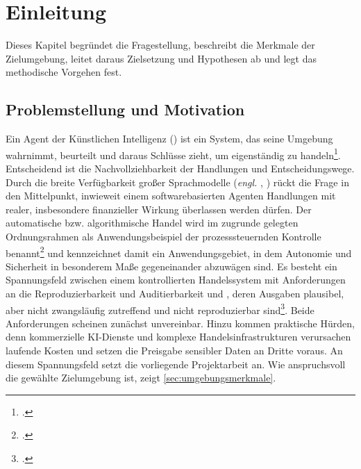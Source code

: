 
\chapter{Einleitung}
\label{cha:einleitung}

Dieses Kapitel begründet die Fragestellung, beschreibt die Merkmale der Zielumgebung, leitet daraus Zielsetzung und Hypothesen ab und legt das methodische Vorgehen fest.

\section{Problemstellung und Motivation}
\label{sec:problemstellung}

Ein Agent der Künstlichen Intelligenz () ist ein System, das seine
Umgebung wahrnimmt, beurteilt und daraus Schlüsse zieht, um eigenständig zu handeln\footcites[vgl.][S.~36]{russellNorvig2021}[vgl.][S.~303]{gollnick2025}[In Anlehnung an das KI-Element-Tripel Assess--Infer--Respond,][S.~15]{bitkom2018}.
Entscheidend ist die Nachvollziehbarkeit der Handlungen und
Entscheidungswege. Durch die breite Verfügbarkeit großer Sprachmodelle
(\textit{engl.} , ) rückt die Frage in den Mittelpunkt,
inwieweit einem softwarebasierten Agenten Handlungen mit realer, insbesondere finanzieller Wirkung überlassen werden dürfen. Der
automatische bzw. algorithmische Handel wird im zugrunde gelegten
Ordnungsrahmen als Anwendungsbeispiel der prozesssteuernden Kontrolle
benannt\footcite[vgl.][S.~18, 86]{bitkom2018} und kennzeichnet damit ein Anwendungsgebiet, in dem Autonomie und Sicherheit in besonderem Maße gegeneinander abzuwägen sind. Es
besteht ein Spannungsfeld zwischen einem kontrollierten Handelssystem mit Anforderungen
an die Reproduzierbarkeit und Auditierbarkeit und , deren Ausgaben
plausibel, aber nicht zwangsläufig zutreffend und nicht reproduzierbar
sind\footcites[vgl.][S.~1]{huangHallucination2025}[vgl.][]{he2025nondeterminism}. Beide Anforderungen scheinen zunächst unvereinbar. Hinzu kommen praktische Hürden, denn kommerzielle KI-Dienste und
komplexe Handelsinfrastrukturen verursachen laufende Kosten und setzen die Preisgabe
sensibler Daten an Dritte voraus. An diesem Spannungsfeld setzt die
vorliegende Projektarbeit an. Wie anspruchsvoll die gewählte Zielumgebung ist,
zeigt \cref{sec:umgebungsmerkmale}.

